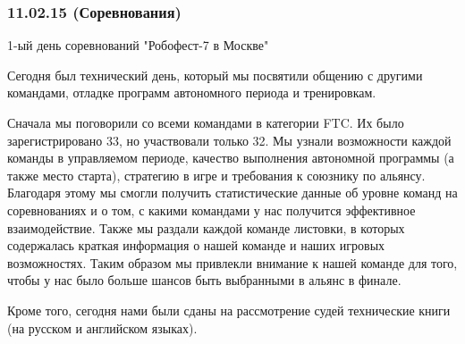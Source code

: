 \subsubsection{11.02.15 (Соревнования)}
\begin{center}
	1-ый день соревнований "Робофест-7 в Москве"
\end{center}
Сегодня был технический день, который мы посвятили общению с другими командами, отладке программ автономного периода и тренировкам.\newline

Сначала мы поговорили со всеми командами в категории FTC. Их было зарегистрировано 33, но участвовали только 32. Мы узнали возможности каждой команды в управляемом периоде, качество выполнения автономной программы (а также место старта), стратегию в игре и требования к союзнику по альянсу. Благодаря этому мы смогли получить статистические данные об уровне команд на соревнованиях и о том, с какими командами у нас получится эффективное взаимодействие. Также мы раздали каждой команде листовки, в которых содержалась краткая информация о нашей команде и наших игровых возможностях. Таким образом мы привлекли внимание к нашей команде для того, чтобы у нас было больше шансов быть выбранными в альянс в финале.\newline

Кроме того, сегодня нами были сданы на рассмотрение судей технические книги (на русском и английском языках).\newline

